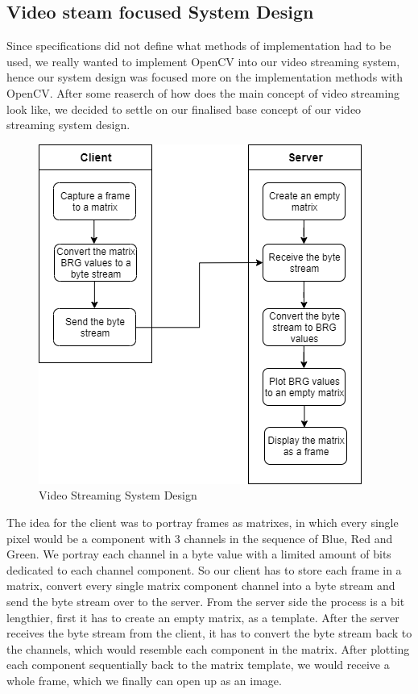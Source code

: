 \documentclass[conference]{IEEEtran}
\begin{document}
\subsection{Video steam focused System Design}
Since specifications did not define what methods of implementation had to be used, we really wanted to implement OpenCV into our video streaming system, hence our system design was focused more on the implementation methods with
OpenCV. After some reaserch of how does the main concept of video streaming look like, we decided to settle on our finalised base concept of our video streaming system design.
\begin{figure}[h!]
	\includegraphics[width=\linewidth]{StreamConceptActivityDiagram.png}
	\caption{Video Streaming System Design}
	\label{fig:VSSD1}
\end{figure}
The idea for the client was to portray frames as matrixes, in which every single pixel would be a component with 3 channels in the sequence of Blue, Red and Green. We portray each channel in a byte value with a limited amount of bits dedicated to each channel component. So our client has to store each frame in a matrix, convert every single matrix component channel into a byte stream and send the byte stream over to the server. From the server side the process is a bit lengthier, first it has to create an empty matrix, as a template. After the server receives the byte stream from the client, it has to convert the byte stream back to the channels, which would resemble each component in the matrix. After plotting each component sequentially back to the matrix template, we would receive a whole frame, which we finally can open up as an image.
\end{document}
